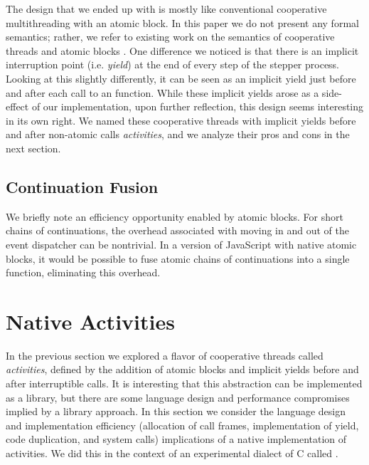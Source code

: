 \documentclass[acmsmall,anonymous,review]{acmart}\settopmatter{printfolios=true,printccs=false,printacmref=false}
\begin{document}
The design that we ended up with is mostly like conventional cooperative multithreading with an atomic block.
In this paper we do not present any formal semantics; rather, we refer to existing work on the semantics of cooperative threads \cite{Abadi2009} and atomic blocks \cite{Moore2008}.
One difference we noticed is that there is an implicit interruption point (i.e. \emph{yield}) at the end of every step of the stepper process.
Looking at this slightly differently, it can be seen as an implicit yield just before and after each call to an \asyncs{} function.
While these implicit yields arose as a side-effect of our implementation, upon further reflection, this design seems interesting in its own right.
We named these cooperative threads with implicit yields before and after non-atomic calls \emph{activities}, and we analyze their pros and cons in the next section.

\subsection{Continuation Fusion}

We briefly note an efficiency opportunity enabled by atomic blocks.
For short chains of continuations, the overhead associated with moving in and out of the event dispatcher can be nontrivial.
In a version of JavaScript with native atomic blocks, it would be possible to fuse atomic chains of continuations into a single function, eliminating this overhead.


\section{Native Activities}

In the previous section we explored a flavor of cooperative threads called \emph{activities}, defined by the addition of atomic blocks and implicit yields before and after interruptible calls.
It is interesting that this abstraction can be implemented as a library, but there are some language design and performance compromises implied by a library approach.
In this section we consider the language design and implementation efficiency (allocation of call frames, implementation of yield, code duplication, and system calls) implications of a native implementation of activities.
We did this in the context of an experimental dialect of C called \charcoal{}.


\end{document}
